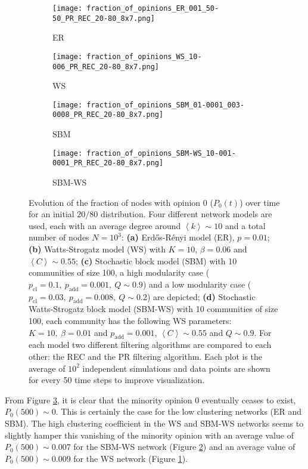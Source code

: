 \documentclass[11 pt , letterpaper , twoside , openright]{book}
\begin{document}
\begin{figure}[H]
  \begin{subfigure}[b]{0.49\textwidth}
  	\texttt{[image: fraction\_of\_opinions\_ER\_001\_50-50\_PR\_REC\_20-80\_8x7.png]}
    \caption{ER}
  \end{subfigure}
  \begin{subfigure}[b]{0.49\textwidth}
  	\texttt{[image: fraction\_of\_opinions\_WS\_10-006\_PR\_REC\_20-80\_8x7.png]}
    \caption{WS}
    \label{ws_20-80_op}
  \end{subfigure}
  \begin{subfigure}[b]{0.49\textwidth}
    \texttt{[image: fraction\_of\_opinions\_SBM\_01-0001\_003-0008\_PR\_REC\_20-80\_8x7.png]}
    \caption{SBM}
  \end{subfigure}
  \begin{subfigure}[b]{0.49\textwidth}
    \texttt{[image: fraction\_of\_opinions\_SBM-WS\_10-001-0001\_PR\_REC\_20-80\_8x7.png]}
    \caption{SBM-WS}
    \label{sbm-ws_20-80_op}
  \end{subfigure}
  \captionsetup{format=plain}
  \caption[Evolution of the fraction of nodes with opinion 0 ($P_0(t)$) over time for an initial $20/80$ opinion distribution.]{Evolution of the fraction of nodes with opinion 0 ($P_0(t)$) over time for an initial $20/80$ distribution. Four different network models are used, each with an average degree around $\left<k\right> \sim 10$ and a total number of nodes $N = 10^3$: \textbf{(a)} Erd\H{o}s-R\'{e}nyi model (ER), $p=0.01$; \textbf{(b)} Watts-Strogatz model (WS) with $K = 10$, $\beta = 0.06$ and $\left<C\right> \sim 0.55$; \textbf{(c)} Stochastic block model (SBM) with 10 communities of size 100, a high modularity case ($p_{\text{cl}} = 0.1,\ p_{\text{add}} = 0.001,\ Q \sim 0.9$) and a low modularity case ($p_{\text{cl}} = 0.03,\ p_{\text{add}} = 0.008,\ Q \sim 0.2$) are depicted; \textbf{(d)} Stochastic Watts-Strogatz block model (SBM-WS) with 10 communities of size 100, each community has the following WS parameters: $K = 10,\ \beta = 0.01$ and $p_{\text{add}} = 0.001$, $\left<C\right> \sim 0.55$ and $Q \sim 0.9$. For each model two different filtering algorithms are compared to each other: the REC and the PR filtering algorithm. Each plot is the average of $10^2$ independent simulations and data points are shown for every 50 time steps to improve visualization.}
\label{ev_op_20_80}
\end{figure}
\noindent
From Figure \ref{ev_op_20_80}, it is clear that the minority opinion 0 eventually ceases to exist, $P_0(500) \sim 0$. This is certainly the case for the low clustering networks (ER and SBM). The high clustering coefficient in the WS and SBM-WS networks seems to slightly hamper this vanishing of the minority opinion with an average value of $P_0(500) \sim 0.007$ for the SBM-WS network (Figure \ref{sbm-ws_20-80_op}) and an average value of $P_0(500) \sim 0.009$ for the WS network (Figure \ref{ws_20-80_op}).\\ 
\end{document}
